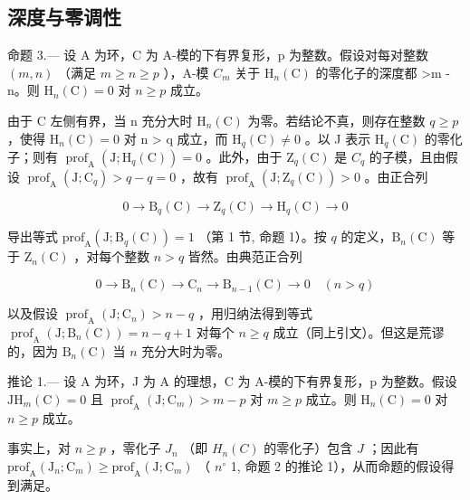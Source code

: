 \subsection{深度与零调性}

命题 3.--- 设 A 为环，C 为 A-模的下有界复形，p 为整数。假设对每对整数 \((m,n)\) （满足 \(m \geqslant n \geqslant p\) ），A-模 \(C_{m}\) 关于 \(\mathrm{H}_{n}(\mathrm{C})\) 的零化子的深度都 \textgreater m - n。则 \(\mathrm{H}_{n}(\mathrm{C}) = 0\) 对 \(n \geqslant p\) 成立。

由于 C 左侧有界，当 n 充分大时 \(\mathrm{H}_{n}(\mathrm{C})\) 为零。若结论不真，则存在整数 \(q \geqslant p\) ，使得 \(\mathrm{H}_{n}(\mathrm{C}) = 0\) 对 n \textgreater{} q 成立，而 \(\mathrm{H}_{q}(\mathrm{C}) \neq 0\) 。以 J 表示 \(\mathrm{H}_{q}(\mathrm{C})\) 的零化子；则有 \(\operatorname{prof}_{\mathrm{A}}(\mathrm{J}; \mathrm{H}_{q}(\mathrm{C})) = 0\) 。此外，由于 \(\mathrm{Z}_{q}(\mathrm{C})\) 是 \(C_{q}\) 的子模，且由假设 \(\operatorname{prof}_{\mathrm{A}}(\mathrm{J}; \mathrm{C}_{q}) > q - q = 0\) ，故有 \(\operatorname{prof}_{\mathrm{A}}(\mathrm{J}; \mathrm{Z}_{q}(\mathrm{C})) > 0\) 。由正合列

\[
0 \to \mathrm{B} _ {q} (\mathrm{C}) \to \mathrm{Z} _ {q} (\mathrm{C}) \to \mathrm{H} _ {q} (\mathrm{C}) \to 0
\]

导出等式 \(\mathrm{prof}_{\mathrm{A}}(\mathrm{J};\mathrm{B}_q(\mathrm{C})) = 1\) （第 1 节, 命题 1）。按 \(q\) 的定义，\(\mathrm{B}_n(\mathrm{C})\) 等于 \(\mathrm{Z}_n(\mathrm{C})\) ，对每个整数 \(n > q\) 皆然。由典范正合列

\[
0 \to \mathrm{B} _ {n} (\mathrm{C}) \to \mathrm{C} _ {n} \to \mathrm{B} _ {n - 1} (\mathrm{C}) \to 0 \quad (n > q)
\]

以及假设 \(\operatorname{prof}_{\mathrm{A}}(\mathrm{J};\mathrm{C}_{n}) > n - q\) ，用归纳法得到等式 \(\operatorname{prof}_{\mathrm{A}}(\mathrm{J};\mathrm{B}_{n}(\mathrm{C})) = n - q + 1\) 对每个 \(n \geqslant q\) 成立（同上引文）。但这是荒谬的，因为 \(\mathrm{B}_{n}(\mathrm{C})\) 当 \(n\) 充分大时为零。

推论 1.--- 设 A 为环，J 为 A 的理想，C 为 A-模的下有界复形，p 为整数。假设 \(\mathrm{JH}_{m}(\mathrm{C}) = 0\) 且 \(\operatorname{prof}_{\mathrm{A}}(\mathrm{J}; \mathrm{C}_{m}) > m - p\) 对 \(m \geqslant p\) 成立。则 \(\mathrm{H}_{n}(\mathrm{C}) = 0\) 对 \(n \geqslant p\) 成立。

事实上，对 \(n \geqslant p\) ，零化子 \(J_n\) （即 \(H_n(C)\) 的零化子）包含 \(J\) ；因此有 \(\mathrm{prof}_{\mathrm{A}}(\mathrm{J}_{n};\mathrm{C}_{m}) \geqslant \mathrm{prof}_{\mathrm{A}}(\mathrm{J};\mathrm{C}_{m})\) （ \(n^{\circ}\) 1, 命题 2 的推论 1），从而命题的假设得到满足。

